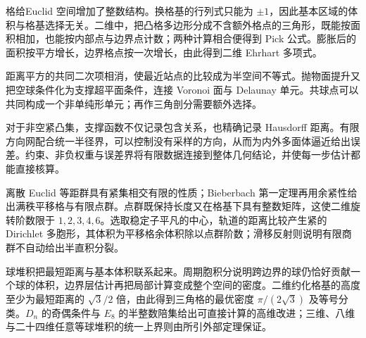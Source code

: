 
\begin{chaptersummary}
	格给Euclid 空间增加了整数结构。换格基的行列式只能为 \(\pm1\)，因此基本区域的体积与格基选择无关。二维中，把凸格多边形分成不含额外格点的三角形，既能按面积相加，也能按内部点与边界点计数；两种计算相合便得到 Pick 公式。膨胀后的面积按平方增长，边界格点按一次增长，由此得到二维 Ehrhart 多项式。

	\ProseParagraphBreak

	距离平方的共同二次项相消，使最近站点的比较成为半空间不等式。抛物面提升又把空球条件化为支撑超平面条件，连接 Voronoi 面与 Delaunay 单元。共球点可以共同构成一个非单纯形单元；再作三角剖分需要额外选择。

	\ProseParagraphBreak

	对于非空紧凸集，支撑函数不仅记录包含关系，也精确记录 Hausdorff 距离。有限方向网配合统一半径界，可以控制没有采样的方向，从而为内外多面体逼近给出误差。约束、非负权重与误差界将有限数据连接到整体几何结论，并使每一步估计都能直接核算。

	\ProseParagraphBreak

	离散 Euclid 等距群具有紧集相交有限的性质；Bieberbach 第一定理再用余紧性给出满秩平移格与有限点群。点群既保持长度又在格基下具有整数矩阵，这使二维旋转阶数限于 \(1,2,3,4,6\)。选取稳定子平凡的中心，轨道的距离比较产生紧的 Dirichlet 多胞形，其体积为平移格余体积除以点群阶数；滑移反射则说明有限商群不自动给出半直积分裂。

	\ProseParagraphBreak

	球堆积把最短距离与基本体积联系起来。周期胞积分说明跨边界的球仍恰好贡献一个球的体积，边界层估计再把局部计算变成整个空间的密度。二维约化格基的高度至少为最短距离的 \(\sqrt3/2\) 倍，由此得到三角格的最优密度 \(\pi/(2\sqrt3)\) 及等号分类。\(D_n\) 的奇偶条件与 \(E_8\) 的半整数陪集给出可直接计算的高维改进；三维、八维与二十四维任意等球堆积的统一上界则由所引外部定理保证。
\end{chaptersummary}

\BookExercises

